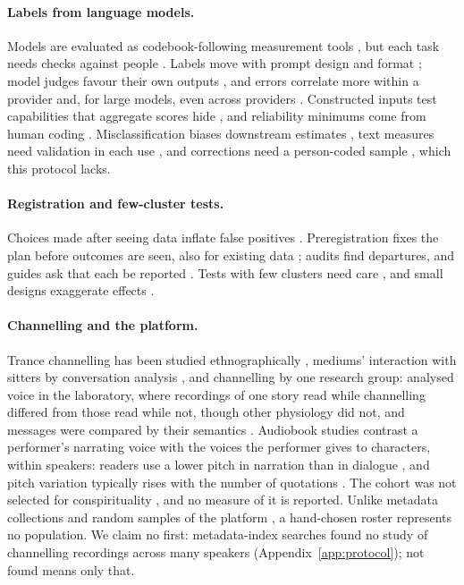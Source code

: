 \paragraph{Labels from language models.} Models are evaluated as codebook-following measurement tools \cite{halterman2026codebook}, but each task needs checks against people \cite{pangakis2024keeping}. Labels move with prompt design and format \cite{atreja2025whats,sclar2024quantifying}; model judges favour their own outputs \cite{panickssery2024evaluators}, and errors correlate more within a provider and, for large models, even across providers \cite{kim2025correlated}. Constructed inputs test capabilities that aggregate scores hide \cite{ribeiro2020beyond}, and reliability minimums come from human coding \cite{krippendorff2004reliability}. Misclassification biases downstream estimates \cite{teblunthuis2023misclassification}, text measures need validation in each use \cite{grimmer2013text,jacobs2019measurement}, and corrections need a person-coded sample \cite{egami2023imperfect,angelopoulos2023prediction}, which this protocol lacks.

\paragraph{Registration and few-cluster tests.} Choices made after seeing data inflate false positives \cite{simmons2011false,gelman2014statistical}. Preregistration fixes the plan before outcomes are seen, also for existing data \cite{nosek2018preregistration,weston2019recommendations,vandenakker2021preregistration}; audits find departures, and guides ask that each be reported \cite{claesen2021comparing,willroth2024best,lakens2024when}. Tests with few clusters need care \cite{canay2017randomization}, and small designs exaggerate effects \cite{card2020little,gelman2014beyond}.

\paragraph{Channelling and the platform.} Trance channelling has been studied ethnographically \cite{hughes1991blending}, mediums' interaction with sitters by conversation analysis \cite{wooffitt2006language}, and channelling by one research group: \citet{wahbeh2019physiological} analysed voice in the laboratory, where recordings of one story read while channelling differed from those read while not, though other physiology did not, and messages were compared by their semantics \cite{wahbeh2026semantic}. Audiobook studies contrast a performer's narrating voice with the voices the performer gives to characters, within speakers: readers use a lower pitch in narration than in dialogue \cite{p12pethe2025prosody}, and pitch variation typically rises with the number of quotations \cite{p12michel2026computational}. The cohort was not selected for conspirituality \cite{ward2011emergence,asprem2015conspirituality}, and no measure of it is reported. Unlike metadata collections and random samples of the platform \cite{hortaribeiro2020youniverse,mcgrady2023dialing}, a hand-chosen roster represents no population. We claim no first: metadata-index searches found no study of channelling recordings across many speakers (Appendix~\ref{app:protocol}); not found means only that.
